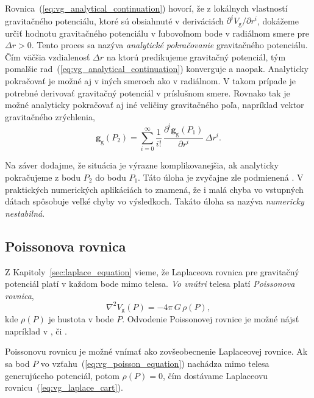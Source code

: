 \documentclass[a4paper, 12pt]{book}
\newcommand{\gidx}{\mathrm g}
\let\vec\mathbf
\begin{document}
Rovnica~(\ref{eq:vg_analytical_continuation}) hovorí, že z lokálnych vlastností 
gravitačného potenciálu, ktoré sú obsiahnuté v deriváciách $\partial^i V_\gidx 
\slash \partial r^i$, dokážeme určiť hodnotu gravitačného potenciálu 
v ľubovoľnom bode v radiálnom smere pre $\Delta r > 0$.  Tento proces sa nazýva 
\emph{analytické pokračovanie} gravitačného potenciálu.  Čím väčšia vzdialenosť 
$\Delta r$ na ktorú predikujeme gravitačný potenciál, tým pomalšie 
rad~(\ref{eq:vg_analytical_continuation}) konverguje a naopak.  Analyticky 
pokračovať je možné aj v iných smeroch ako v radiálnom.  V takom prípade je 
potrebné derivovať gravitačný potenciál v príslušnom smere.  Rovnako tak je 
možné analyticky pokračovať aj iné veličiny gravitačného poľa, napríklad vektor 
gravitačného zrýchlenia,
%
\begin{equation}
\vec g_\gidx(P_2) = \sum_{i = 0}^{\infty} \frac{1}{i!} \, \frac{\partial^i \vec 
g_\gidx(P_1)}{\partial r^i} \, \Delta r^i{.}
\end{equation}

Na záver dodajme, že situácia je výrazne komplikovanejšia, ak analyticky 
pokračujeme z bodu $P_2$ do bodu $P_1$.  Táto úloha je zvyčajne zle podmienená 
\citep{SansoGeodeticBoundaryValueProblem}.  V praktických numerických 
aplikáciách to znamená, že i malá chyba vo vstupných dátach spôsobuje veľké 
chyby vo výsledkoch.  Takáto úloha sa nazýva \emph{numericky nestabilná}.  






\subsection{Poissonova rovnica}
\label{sec:poisson_equation}

Z Kapitoly~\ref{sec:laplace_equation} vieme, že Laplaceova rovnica pre 
gravitačný potenciál platí v každom bode mimo telesa.  \emph{Vo vnútri} telesa 
platí \emph{Poissonova rovnica},
%
\begin{equation}
\label{eq:vg_poisson_equation}
\nabla^2 V_\gidx(P) = -4 \pi \, G \, \rho(P){,}
\end{equation}
%
kde $\rho(P)$ je hustota v bode $P$.  Odvodenie Poissonovej rovnice je možné 
nájsť napríklad v \cite{MacMillan1930}, \cite{Kellogg1967} či 
\cite{SansoGeoidDetermination}.

Poissonovu rovnicu je možné vnímať ako zovšeobecnenie Laplaceovej rovnice.  Ak 
sa bod $P$ vo vzťahu~(\ref{eq:vg_poisson_equation}) nachádza mimo telesa 
generujúceho potenciál, potom $\rho(P) = 0$, čím dostávame Laplaceovu 
rovnicu~(\ref{eq:vg_laplace_cart}).
\end{document}
